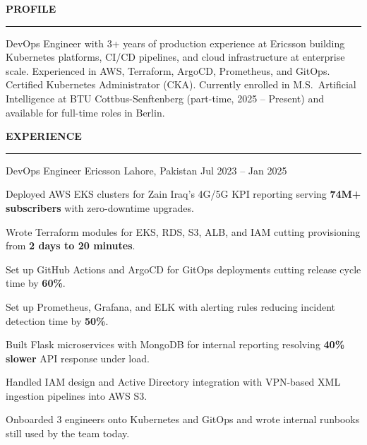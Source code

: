 \documentclass[11pt, a4paper]{awesome-cv}
\renewcommand{\acvSectionTopSkip}{2mm}
\renewcommand{\acvSectionContentTopSkip}{1.5mm}
\renewcommand{\cvsection}[1]{%
  \vspace{\acvSectionTopSkip}
  \phantomsection{}
  {\fontsize{16pt}{1em}\bodyfont\bfseries\color{sectioncolor}\MakeUppercase{#1}}\\[-2mm]
  {\color{sectioncolor}\hrule}
  \vspace{\acvSectionContentTopSkip}
}
\begin{document}
\makecvheader[C]

\cvsection{Profile}

\begin{cvparagraph}
DevOps Engineer with 3+ years of production experience at Ericsson building Kubernetes platforms, CI/CD pipelines, and cloud infrastructure at enterprise scale. Experienced in AWS, Terraform, ArgoCD, Prometheus, and GitOps. Certified Kubernetes Administrator (CKA). Currently enrolled in M.S.\ Artificial Intelligence at BTU Cottbus-Senftenberg (part-time, 2025 -- Present) and available for full-time roles in Berlin.
\end{cvparagraph}

\cvsection{Experience}

\begin{cventries}

  \cventry
    {DevOps Engineer}
    {Ericsson}
    {Lahore, Pakistan}
    {Jul 2023 -- Jan 2025}
    {
      \begin{cvitems}
        \item {Deployed AWS EKS clusters for Zain Iraq's 4G/5G KPI reporting serving \textbf{74M+ subscribers} with zero-downtime upgrades.}
        \item {Wrote Terraform modules for EKS, RDS, S3, ALB, and IAM cutting provisioning from \textbf{2 days to 20 minutes}.}
        \item {Set up GitHub Actions and ArgoCD for GitOps deployments cutting release cycle time by \textbf{60\%}.}
        \item {Set up Prometheus, Grafana, and ELK with alerting rules reducing incident detection time by \textbf{50\%}.}
        \item {Built Flask microservices with MongoDB for internal reporting resolving \textbf{40\% slower} API response under load.}
        \item {Handled IAM design and Active Directory integration with VPN-based XML ingestion pipelines into AWS S3.}
        \item {Onboarded 3 engineers onto Kubernetes and GitOps and wrote internal runbooks still used by the team today.}
      \end{cvitems}
    }


\end{cventries}
\end{document}
